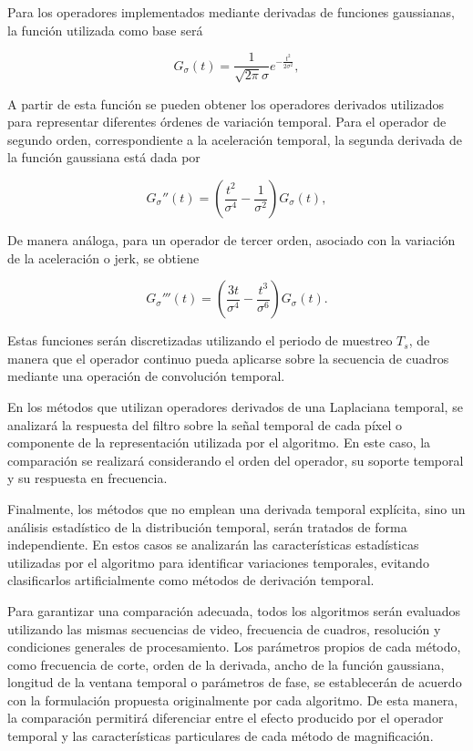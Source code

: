 Para los operadores implementados mediante derivadas de funciones gaussianas, la función utilizada como base será

$$
G_{\sigma}(t)=
\frac{1}{\sqrt{2\pi}\sigma}
e^{-\frac{t^2}{2\sigma^2}},
$$

A partir de esta función se pueden obtener los operadores derivados utilizados para representar diferentes órdenes de variación temporal. Para el operador de segundo orden, correspondiente a la aceleración temporal, la segunda derivada de la función gaussiana está dada por

$$
G_{\sigma}''(t)=
\left(
\frac{t^2}{\sigma^4}
-\frac{1}{\sigma^2}
\right)G_{\sigma}(t),
$$

De manera análoga, para un operador de tercer orden, asociado con la variación de la aceleración o jerk, se obtiene

$$
G_{\sigma}'''(t)=
\left(
\frac{3t}{\sigma^4}
-\frac{t^3}{\sigma^6}
\right)G_{\sigma}(t).
$$

Estas funciones serán discretizadas utilizando el periodo de muestreo \(T_s\), de manera que el operador continuo pueda aplicarse sobre la secuencia de cuadros mediante una operación de convolución temporal.

En los métodos que utilizan operadores derivados de una Laplaciana temporal, se analizará la respuesta del filtro sobre la señal temporal de cada píxel o componente de la representación utilizada por el algoritmo. En este caso, la comparación se realizará considerando el orden del operador, su soporte temporal y su respuesta en frecuencia.

Finalmente, los métodos que no emplean una derivada temporal explícita, sino un análisis estadístico de la distribución temporal, serán tratados de forma independiente. En estos casos se analizarán las características estadísticas utilizadas por el algoritmo para identificar variaciones temporales, evitando clasificarlos artificialmente como métodos de derivación temporal.

Para garantizar una comparación adecuada, todos los algoritmos serán evaluados utilizando las mismas secuencias de video, frecuencia de cuadros, resolución y condiciones generales de procesamiento. Los parámetros propios de cada método, como frecuencia de corte, orden de la derivada, ancho de la función gaussiana, longitud de la ventana temporal o parámetros de fase, se establecerán de acuerdo con la formulación propuesta originalmente por cada algoritmo. De esta manera, la comparación permitirá diferenciar entre el efecto producido por el operador temporal y las características particulares de cada método de magnificación.


